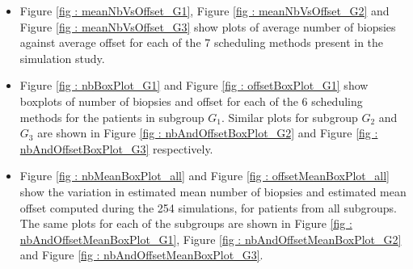\begin{itemize}
  \item Figure \ref{fig : meanNbVsOffset_G1}, Figure \ref{fig : meanNbVsOffset_G2} and Figure \ref{fig : meanNbVsOffset_G3} show plots of average number of biopsies against average offset for each of the 7 scheduling methods present in the simulation study.
  \item Figure \ref{fig : nbBoxPlot_G1} and Figure \ref{fig : offsetBoxPlot_G1} show boxplots of number of biopsies and offset for each of the 6 scheduling methods for the patients in subgroup $G_1$. Similar plots for subgroup $G_2$ and $G_3$ are shown in Figure \ref{fig : nbAndOffsetBoxPlot_G2} and Figure \ref{fig : nbAndOffsetBoxPlot_G3} respectively.
  \item Figure \ref{fig : nbMeanBoxPlot_all} and Figure \ref{fig : offsetMeanBoxPlot_all} show the variation in estimated mean number of biopsies and estimated mean offset computed during the 254 simulations, for patients from all subgroups. The same plots for each of the subgroups are shown in Figure \ref{fig : nbAndOffsetMeanBoxPlot_G1}, Figure \ref{fig : nbAndOffsetMeanBoxPlot_G2} and Figure \ref{fig : nbAndOffsetMeanBoxPlot_G3}.
\end{itemize} 

